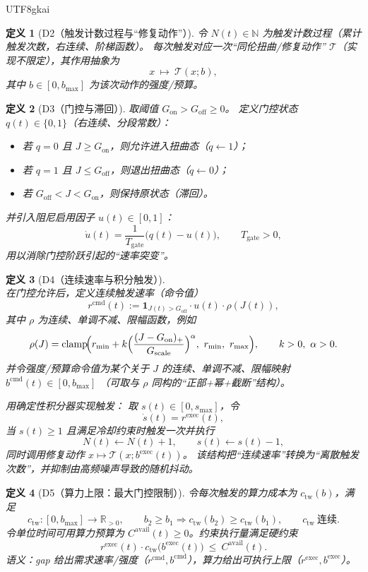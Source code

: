 \documentclass[12pt]{article}
\newtheorem{definition}{定义}[section]
\newcommand{\RR}{\mathbb{R}}
\newcommand{\NN}{\mathbb{N}}
\newcommand{\indicator}[1]{\mathbf{1}_{#1}}
\newcommand{\clamp}{\operatorname{clamp}}
\begin{document}
\begin{CJK*}{UTF8}{gkai}
\begin{definition}[D2（触发计数过程与“修复动作”）]
\label{def:tex28-ch5-d2}
令 $N(t)\in\NN$ 为触发计数过程（累计触发次数，右连续、阶梯函数）。
每次触发对应一次“同伦扭曲/修复动作” $\mathcal{T}$（实现不限定），其作用抽象为
\[
  x\ \mapsto\ \mathcal{T}(x; b),
\]
其中 $b\in[0,b_{\max}]$ 为该次动作的强度/预算。
\end{definition}

\begin{definition}[D3（门控与滞回）]
\label{def:tex28-ch5-d3}
取阈值 $G_{\mathrm{on}}>G_{\mathrm{off}}\ge 0$。
定义门控状态 $q(t)\in\{0,1\}$（右连续、分段常数）：
\begin{itemize}
  \item 若 $q=0$ 且 $J\ge G_{\mathrm{on}}$，则允许进入扭曲态（$q\leftarrow 1$）；
  \item 若 $q=1$ 且 $J\le G_{\mathrm{off}}$，则退出扭曲态（$q\leftarrow 0$）；
  \item 若 $G_{\mathrm{off}}<J<G_{\mathrm{on}}$，则保持原状态（滞回）。
\end{itemize}
并引入阻尼启用因子 $u(t)\in[0,1]$：
\[
  \dot u(t)=\frac{1}{T_{\mathrm{gate}}}\bigl(q(t)-u(t)\bigr),
  \qquad
  T_{\mathrm{gate}}>0,
\]
用以消除门控阶跃引起的“速率突变”。
\end{definition}

\begin{definition}[D4（连续速率与积分触发）]
\label{def:tex28-ch5-d4}
在门控允许后，定义连续触发速率（命令值）
\[
  r^{\mathrm{cmd}}(t):=\indicator{J(t)>G_{\mathrm{off}}}\cdot u(t)\cdot \rho(J(t)),
\]
其中 $\rho$ 为连续、单调不减、限幅函数，例如
\[
  \rho(J)=\clamp\!\Bigl(
  r_{\min}+k\Bigl(\frac{(J-G_{\mathrm{on}})_{+}}{G_{\mathrm{scale}}}\Bigr)^{\alpha},
  \ r_{\min},\ r_{\max}\Bigr),
  \qquad
  k>0,\ \alpha>0.
\]
并令强度/预算命令值为某个关于 $J$ 的连续、单调不减、限幅映射 $b^{\mathrm{cmd}}(t)\in[0,b_{\max}]$
（可取与 $\rho$ 同构的“正部+幂+截断”结构）。

用确定性积分器实现触发：
取 $s(t)\in[0,s_{\max}]$，令
\[
  \dot s(t)=r^{\mathrm{exec}}(t),
\]
当 $s(t)\ge 1$ 且满足冷却约束时触发一次并执行
\[
  N(t)\leftarrow N(t)+1,\qquad s(t)\leftarrow s(t)-1,
\]
同时调用修复动作 $x\mapsto \mathcal{T}(x;b^{\mathrm{exec}}(t))$。
该结构把“连续速率”转换为“离散触发次数”，并抑制由高频噪声导致的随机抖动。
\end{definition}

\begin{definition}[D5（算力上限：最大门控限制）]
\label{def:tex28-ch5-d5}
令每次触发的算力成本为 $c_{\mathrm{tw}}(b)$，满足
\[
  c_{\mathrm{tw}}:[0,b_{\max}]\to\RR_{>0},
  \qquad
  b_2\ge b_1\Rightarrow c_{\mathrm{tw}}(b_2)\ge c_{\mathrm{tw}}(b_1),
  \qquad
  c_{\mathrm{tw}}\ \text{连续}.
\]
令单位时间可用算力预算为 $C^{\mathrm{avail}}(t)\ge 0$。约束执行量满足硬约束
\[
  r^{\mathrm{exec}}(t)\cdot c_{\mathrm{tw}}\bigl(b^{\mathrm{exec}}(t)\bigr)\ \le\ C^{\mathrm{avail}}(t).
\]
语义：gap 给出需求速率/强度（$r^{\mathrm{cmd}},b^{\mathrm{cmd}}$），算力给出可执行上限（$r^{\mathrm{exec}},b^{\mathrm{exec}}$）。
\end{definition}


\end{CJK*}
\end{document}
